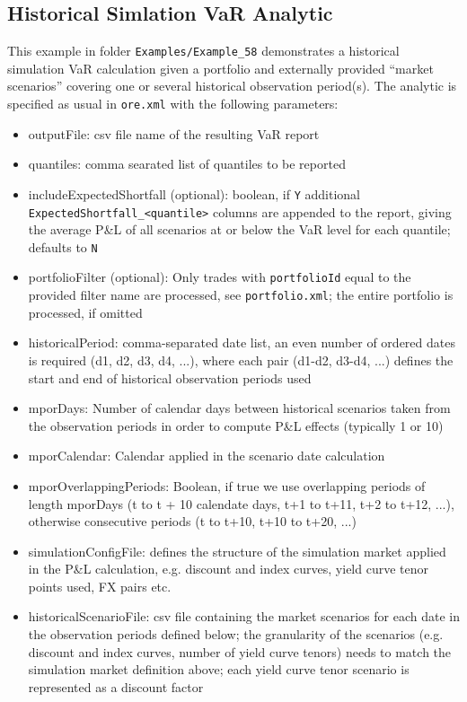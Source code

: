\subsection{Historical Simlation VaR Analytic}%
\label{example:58}

This example in folder {\tt Examples/Example\_58} demonstrates a historical simulation VaR calculation
given a portfolio and externally provided ``market scenarios'' covering
one or several historical observation period(s).
The analytic is specified as usual in {\tt ore.xml} with the following parameters:
\begin{itemize}
\item outputFile: csv file name of the resulting VaR report
\item quantiles: comma searated list of quantiles to be reported
\item includeExpectedShortfall (optional): boolean, if {\tt Y} additional {\tt ExpectedShortfall\_<quantile>} columns are appended to the report, giving the average P\&L of all scenarios at or below the VaR level for each quantile; defaults to {\tt N}
\item portfolioFilter (optional): Only trades with {\tt portfolioId} equal to the provided filter name are processed, see {\tt portfolio.xml}; the entire portfolio is processed, if omitted
\item historicalPeriod: comma-separated date list, an even number of ordered dates is required (d1, d2, d3, d4, ...), where each pair (d1-d2, d3-d4, ...) defines the start and end of historical observation periods used
\item mporDays: Number of calendar days between historical scenarios taken from the observation periods in order to compute P\&L effects (typically 1 or 10)
\item mporCalendar: Calendar applied in the scenario date calculation
\item mporOverlappingPeriods: Boolean, if true we use overlapping periods of length mporDays (t to t + 10 calendate days, t+1 to t+11, t+2 to t+12, ...), otherwise consecutive periods (t to t+10, t+10 to t+20, ...)
\item simulationConfigFile: defines the structure of the simulation market applied in the P\&L calculation, e.g. discount and index curves, yield curve tenor points used, FX pairs etc.
\item historicalScenarioFile: csv file containing the market scenarios for each date in the observation periods defined below; the granularity of the scenarios (e.g. discount and index curves, number of yield curve tenors) needs to match the simulation market definition above; each yield curve tenor scenario is represented as a discount factor
\end{itemize}

